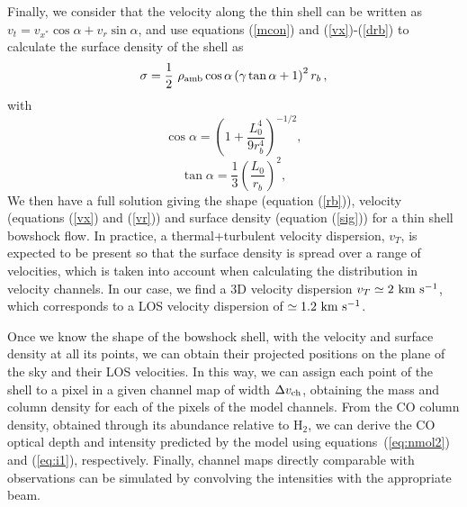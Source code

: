 \documentclass[12pt]{mythesis}
\begin{document}
Finally, we consider that the velocity along the thin shell can be written as $v_t=v_{x^*}\cos\alpha+v_r\sin\alpha$, and use equations (\ref{mcon}) and (\ref{vx})-(\ref{drb}) to calculate
the surface density of the shell as
\begin{equation}
	\sigma=\frac{1}{2}~\rho_{\rm amb}\cos\alpha\left(\gamma\tan\alpha + 1\right)^2 r_b\,,
	\label{sig}
\end{equation}
with
\begin{equation}
	\cos\alpha=\left(1+\frac{L_0^4}{9r_b^4}\right)^{-1/2},
  \label{cal}
\end{equation}
\begin{equation}
	\tan\alpha = \frac{1}{3}\left(\frac{L_0}{r_b}\right)^2,
\end{equation}
We then have a full solution giving the shape (equation (\ref{rb})), velocity (equations (\ref{vx}) and (\ref{vr})) and surface density (equation (\ref{sig})) for a thin shell bowshock flow. In practice, a thermal+turbulent velocity dispersion, $v_T$, is expected to be present so that the surface density is spread over a range of velocities, which is taken into account when calculating the distribution in velocity channels. In our case, we find a 3D velocity dispersion $v_T\simeq 2~\mbox{km s$^{-1}$}$, which corresponds to a LOS velocity dispersion of $\simeq 1.2~\mbox{km s$^{-1}$}$. 

Once we know the shape of the bowshock shell, with the velocity and surface density at all its points, we can obtain their projected positions on the plane of the sky and their LOS velocities. 
In this way, we can assign each point of the shell to a pixel in a given channel map of width $\Delta v_{\rm ch}$, obtaining the mass and column density for each of the pixels of the model channels.
 From the CO column density, obtained through its abundance relative to H$_2$, we can derive the CO optical depth and intensity predicted by the model using equations~(\ref{eq:nmol2}) and (\ref{eq:i1}), respectively. Finally, channel maps directly comparable with observations can be simulated by convolving the intensities with the appropriate beam. 
\end{document}
